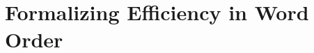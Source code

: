 \documentclass[9pt,twocolumn,twoside,lineno]{pnas-new}
\begin{document}
%


\section{Formalizing Efficiency in Word Order}
\end{document}
